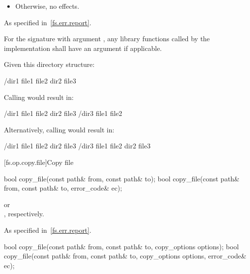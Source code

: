 \begin{itemdescr}
\begin{itemize}
\item
Otherwise, no effects.
\end{itemize}

\pnum
\throws
As specified in~\ref{fs.err.report}.

\pnum
\remarks
For the signature with argument , any
library functions called by the implementation shall have an  argument if applicable.

\pnum
\begin{example}
Given this directory structure:
\begin{outputblock}
/dir1
  file1
  file2
  dir2
    file3
\end{outputblock}

Calling  would result in:
\begin{outputblock}
/dir1
  file1
  file2
  dir2
    file3
/dir3
  file1
  file2
\end{outputblock}

Alternatively, calling  would result in:
\begin{outputblock}
/dir1
  file1
  file2
  dir2
    file3
/dir3
  file1
  file2
  dir2
    file3
\end{outputblock}
\end{example}
\end{itemdescr}


[fs.op.copy.file]{Copy file}

%
\begin{itemdecl}
bool copy_file(const path& from, const path& to);
bool copy_file(const path& from, const path& to, error_code& ec);
\end{itemdecl}

\begin{itemdescr}
\pnum
\returns
{} or\\
, respectively.

\pnum
\throws
As specified in~\ref{fs.err.report}.
\end{itemdescr}

%
\begin{itemdecl}
bool copy_file(const path& from, const path& to, copy_options options);
bool copy_file(const path& from, const path& to, copy_options options,
               error_code& ec);
\end{itemdecl}

